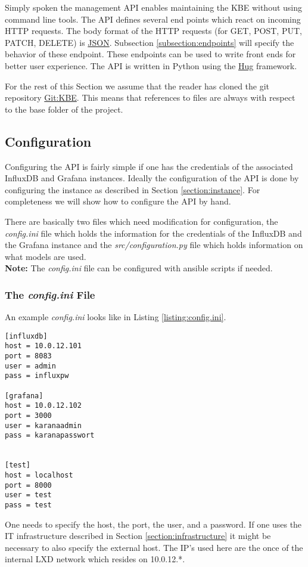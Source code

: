 \lstset{language=Python}          %
Simply spoken the management API enables maintaining the KBE without using command line tools. The API defines several end points which react on incoming HTTP requests. The body format of the HTTP requests (for GET, POST, PUT, PATCH, DELETE) is \href{http://json.org/}{JSON}. Subsection \ref{subsection:endpoints} will specify the behavior of these endpoint. These endpoints can be used to write front ends for better user experience. 
The API is written in Python using the \href{http://www.hug.rest/}{Hug} framework.

For the rest of this Section we assume that the reader has cloned the git repository \href{http://gitlab.me-soldesign.com/karana/backend-api.git}{Git:KBE}. This means that references to files are always with respect to the base folder of the project. 

\subsection{Configuration}
Configuring the API is fairly simple if one has the credentials of the associated InfluxDB and Grafana instances. Ideally the configuration of the API is done by configuring the instance as described in Section \ref{section:instance}. For completeness we will show how to configure the API by hand. 

There are basically two files which need modification for configuration, the \textit{config.ini} file which holds the information for the credentials of the InfluxDB and the Grafana instance and the \textit{src/configuration.py} file which holds information on what models are used. \\
\textbf{Note:} The \textit{config.ini} file can be configured with ansible scripts if needed. 

\subsubsection{The \textit{config.ini} File}
An example  \textit{config.ini} looks like in Listing \ref{listing:config.ini}.
\lstset{language=XML}  
\begin{lstlisting}[caption={Example of a \textit{config.ini} file},label={listing:config.ini}]
[influxdb]
host = 10.0.12.101
port = 8083
user = admin
pass = influxpw

[grafana]
host = 10.0.12.102
port = 3000
user = karanaadmin
pass = karanapasswort


[test]
host = localhost
port = 8000
user = test
pass = test
\end{lstlisting}
One needs to specify the host, the port, the user, and a password. If one uses the IT infrastructure described in Section \ref{section:infrastructure} it might be necessary to also specify the external host. The IP's used here are the once of the internal LXD network which resides on 10.0.12.*.

